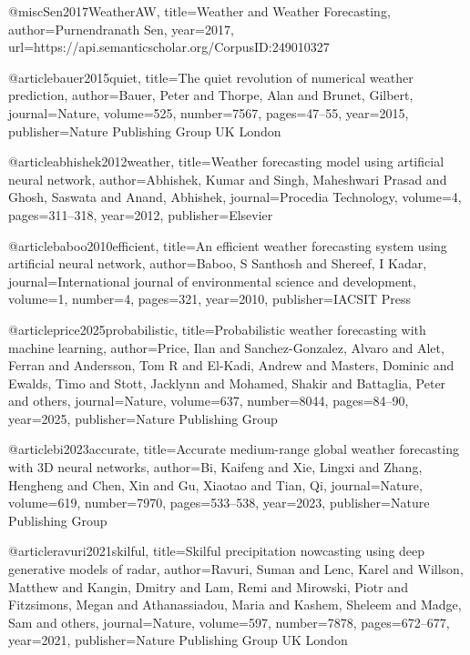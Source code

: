 @misc{Sen2017WeatherAW,
  title={Weather and Weather Forecasting},
  author={Purnendranath Sen},
  year={2017},
  url={https://api.semanticscholar.org/CorpusID:249010327}
}

@article{bauer2015quiet,
  title={The quiet revolution of numerical weather prediction},
  author={Bauer, Peter and Thorpe, Alan and Brunet, Gilbert},
  journal={Nature},
  volume={525},
  number={7567},
  pages={47--55},
  year={2015},
  publisher={Nature Publishing Group UK London}
}

@article{abhishek2012weather,
  title={Weather forecasting model using artificial neural network},
  author={Abhishek, Kumar and Singh, Maheshwari Prasad and Ghosh, Saswata and Anand, Abhishek},
  journal={Procedia Technology},
  volume={4},
  pages={311--318},
  year={2012},
  publisher={Elsevier}
}

@article{baboo2010efficient,
  title={An efficient weather forecasting system using artificial neural network},
  author={Baboo, S Santhosh and Shereef, I Kadar},
  journal={International journal of environmental science and development},
  volume={1},
  number={4},
  pages={321},
  year={2010},
  publisher={IACSIT Press}
}

@article{price2025probabilistic,
  title={Probabilistic weather forecasting with machine learning},
  author={Price, Ilan and Sanchez-Gonzalez, Alvaro and Alet, Ferran and Andersson, Tom R and El-Kadi, Andrew and Masters, Dominic and Ewalds, Timo and Stott, Jacklynn and Mohamed, Shakir and Battaglia, Peter and others},
  journal={Nature},
  volume={637},
  number={8044},
  pages={84--90},
  year={2025},
  publisher={Nature Publishing Group}
}

@article{bi2023accurate,
  title={Accurate medium-range global weather forecasting with 3D neural networks},
  author={Bi, Kaifeng and Xie, Lingxi and Zhang, Hengheng and Chen, Xin and Gu, Xiaotao and Tian, Qi},
  journal={Nature},
  volume={619},
  number={7970},
  pages={533--538},
  year={2023},
  publisher={Nature Publishing Group}
}

@article{ravuri2021skilful,
  title={Skilful precipitation nowcasting using deep generative models of radar},
  author={Ravuri, Suman and Lenc, Karel and Willson, Matthew and Kangin, Dmitry and Lam, Remi and Mirowski, Piotr and Fitzsimons, Megan and Athanassiadou, Maria and Kashem, Sheleem and Madge, Sam and others},
  journal={Nature},
  volume={597},
  number={7878},
  pages={672--677},
  year={2021},
  publisher={Nature Publishing Group UK London}
}

